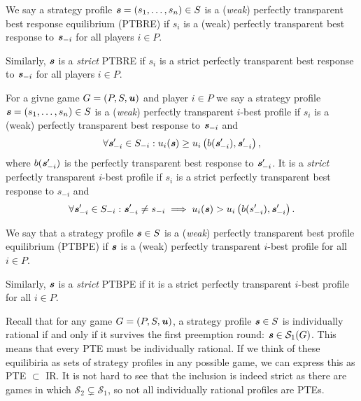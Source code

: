 \begin{definition}
	We say a strategy profile $\boldsymbol{\mathit{s}} = (s_1, \dots, s_n) \in S$ is a (\textit{weak}) perfectly transparent best response equilibrium (PTBRE) if $s_i$ is a (weak) perfectly transparent best response to $\boldsymbol{\mathit{s}}_{-i}$ for all players $i \in P$.
	
	Similarly, $\boldsymbol{\mathit{s}}$ is a \textit{strict} PTBRE if $s_i$ is a strict perfectly transparent best response to $\boldsymbol{\mathit{s}}_{-i}$ for all players $i \in P$.
\end{definition}

\begin{definition}
	For a givne game $G = (P, S, \boldsymbol{\mathit{u}})$ and player $i \in P$ we say a strategy profile $\boldsymbol{\mathit{s}} = (s_1, \dots, s_n) \in S$ is a (\textit{weak}) perfectly transparent $i$-best profile if
	$s_i$ is a (weak) perfectly transparent best response to $\boldsymbol{\mathit{s}}_{-i}$ and
	\[
		\forall \boldsymbol{\mathit{s}}'_{-i} \in S_{-i}: u_i(\boldsymbol{\mathit{s}}) \ge u_i\left(b(\boldsymbol{\mathit{s}}'_{-i}), \boldsymbol{\mathit{s}}'_{-i}\right),
	\]
	where $b(\boldsymbol{\mathit{s}}'_{-i})$ is the perfectly transparent best response to $\boldsymbol{\mathit{s}}'_{-i}$.
	It is a \textit{strict} perfectly transparent $i$-best profile if $s_i$ is a strict perfectly transparent best response to $s_{-i}$ and
	\[
		\forall \boldsymbol{\mathit{s}}_{-i}' \in S_{-i}: \boldsymbol{\mathit{s}}_{-i}' \ne s_{-i} \implies u_i(\boldsymbol{\mathit{s}}) > u_i\left(b(s_{-i}'), \boldsymbol{\mathit{s}}_{-i}'\right).
	\]
\end{definition}

\begin{definition}
	We say that a strategy profile $\boldsymbol{\mathit{s}} \in S$ is a (\textit{weak}) perfectly transparent best profile equilibrium (PTBPE) if $\boldsymbol{\mathit{s}}$ is a (weak) perfectly transparent $i$-best profile for all $i \in P$.

	Similarly, $\boldsymbol{\mathit{s}}$ is a \textit{strict} PTBPE if it is a strict perfectly transparent $i$-best profile for all $i \in P$.
\end{definition}

Recall that for any game $G = (P, S, \boldsymbol{\mathit{u}})$, a strategy profile $\boldsymbol{\mathit{s}} \in S$ is individually rational if and only if it survives the first preemption round: $\boldsymbol{\mathit{s}} \in \mathcal{S}_1(G)$.
This means that every PTE must be individually rational.
If we think of these equilibiria as sets of strategy profiles in any possible game, we can express this as PTE $\subset$ IR.
It is not hard to see that the inclusion is indeed strict as there are games in which $\mathcal{S}_2 \subsetneq \mathcal{S}_1$, so not all individually rational profiles are PTEs.

